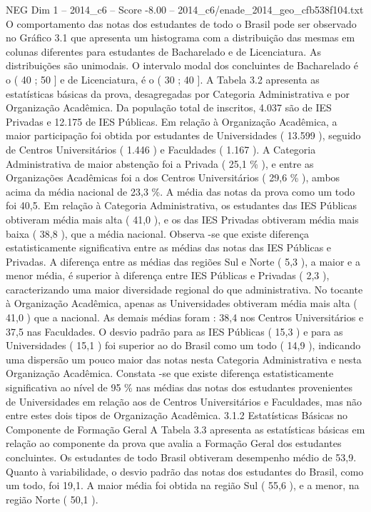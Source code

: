 \begin{textsample}{NEG Dim 1 – 2014\_c6 – Score -8.00 – 2014\_c6/enade\_2014\_geo\_cfb538f104.txt}
O comportamento das notas dos estudantes de todo o Brasil pode ser observado no Gráfico 3.1 que apresenta um histograma com a distribuição das mesmas em colunas diferentes para estudantes de Bacharelado e de Licenciatura.
As distribuições são unimodais.
O intervalo modal dos concluintes de Bacharelado é o ( 40 ; 50 ] e de Licenciatura, é o ( 30 ; 40 ].
A Tabela 3.2 apresenta as estatísticas básicas da prova, desagregadas por Categoria Administrativa e por Organização Acadêmica.
Da população total de inscritos, 4.037 são de IES Privadas e 12.175 de IES Públicas.
Em relação à Organização Acadêmica, a maior participação foi obtida por estudantes de Universidades ( 13.599 ), seguido de Centros Universitários ( 1.446 ) e Faculdades ( 1.167 ).
A Categoria Administrativa de maior abstenção foi a Privada ( 25,1 \% ), e entre as Organizações Acadêmicas foi a dos Centros Universitários ( 29,6 \% ), ambos acima da média nacional de 23,3 \%.
A média das notas da prova como um todo foi 40,5.
Em relação à Categoria Administrativa, os estudantes das IES Públicas obtiveram média mais alta ( 41,0 ), e os das IES Privadas obtiveram média mais baixa ( 38,8 ), que a média nacional.
Observa -se que existe diferença estatisticamente significativa entre as médias das notas das IES Públicas e Privadas.
A diferença entre as médias das regiões Sul e Norte ( 5,3 ), a maior e a menor média, é superior à diferença entre IES Públicas e Privadas ( 2,3 ), caracterizando uma maior diversidade regional do que administrativa.
No tocante à Organização Acadêmica, apenas as Universidades obtiveram média mais alta ( 41,0 ) que a nacional.
As demais médias foram : 38,4 nos Centros Universitários e 37,5 nas Faculdades.
O desvio padrão para as IES Públicas ( 15,3 ) e para as Universidades ( 15,1 ) foi superior ao do Brasil como um todo ( 14,9 ), indicando uma dispersão um pouco maior das notas nesta Categoria Administrativa e nesta Organização Acadêmica.
Constata -se que existe diferença estatisticamente significativa ao nível de 95 \% nas médias das notas dos estudantes provenientes de Universidades em relação aos de Centros Universitários e Faculdades, mas não entre estes dois tipos de Organização Acadêmica. 3.1.2 Estatísticas Básicas no Componente de Formação Geral A Tabela 3.3 apresenta as estatísticas básicas em relação ao componente da prova que avalia a Formação Geral dos estudantes concluintes.
Os estudantes de todo Brasil obtiveram desempenho médio de 53,9.
Quanto à variabilidade, o desvio padrão das notas dos estudantes do Brasil, como um todo, foi 19,1.
A maior média foi obtida na região Sul ( 55,6 ), e a menor, na região Norte ( 50,1 ).

\end{textsample}
